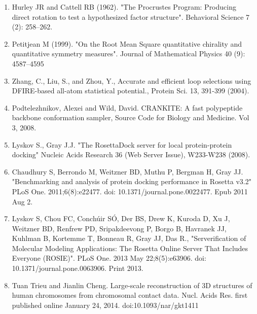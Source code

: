 \documentclass{article}
\begin{document}
\begin{enumerate}
\item Hurley JR and Cattell RB (1962). "The Procrustes Program: Producing direct rotation to test a hypothesized factor structure". Behavioral Science 7 (2): 258–262.

\item Petitjean M (1999). "On the Root Mean Square quantitative chirality and quantitative symmetry measures". Journal of Mathematical Physics 40 (9): 4587–4595

\item Zhang, C., Liu, S., and Zhou, Y., Accurate and efficient loop selections using DFIRE-based all-atom statistical potential., Protein Sci. 13, 391-399 (2004).

\item Podtelezhnikov, Alexei and Wild, David.  CRANKITE: A fast polypeptide backbone conformation sampler, Source Code for Biology and Medicine.  Vol 3, 2008.

\item Lyskov S., Gray J.J. "The RosettaDock server for local protein-protein docking" Nucleic Acids Research 36 (Web Server Issue), W233-W238 (2008).

\item Chaudhury S, Berrondo M, Weitzner BD, Muthu P, Bergman H, Gray JJ. "Benchmarking and analysis of protein docking performance in Rosetta v3.2" PLoS One. 2011;6(8):e22477. doi: 10.1371/journal.pone.0022477. Epub 2011 Aug 2.

\item Lyskov S, Chou FC, Conchúir SÓ, Der BS, Drew K, Kuroda D, Xu J, Weitzner BD, Renfrew PD, Sripakdeevong P, Borgo B, Havranek JJ, Kuhlman B, Kortemme T, Bonneau R, Gray JJ, Das R., "Serverification of Molecular Modeling Applications: The Rosetta Online Server That Includes Everyone (ROSIE)". PLoS One. 2013 May 22;8(5):e63906. doi: 10.1371/journal.pone.0063906. Print 2013.

\item Tuan Trieu and Jianlin Cheng.  Large-scale reconstruction of 3D structures of human chromosomes from chromosomal contact data.  Nucl. Acids Res. first published online January 24, 2014. doi:10.1093/nar/gkt1411

\end{enumerate}
\end{document}
